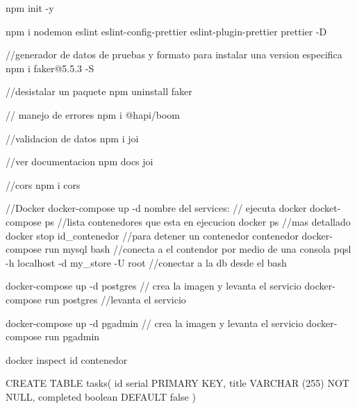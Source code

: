 npm init -y

npm i nodemon eslint eslint-config-prettier eslint-plugin-prettier prettier -D


//generador de datos de pruebas y formato para instalar una version especifica
npm i faker@5.5.3 -S

//desistalar un paquete
npm uninstall faker

// manejo de errores
npm i @hapi/boom

//validacion de datos
npm i joi

//ver documentacion
npm docs joi

//cors
npm i cors

//Docker
docker-compose up -d {nombre del services:} // ejecuta docker
docket-compose ps //lista contenedores que esta en ejecucion
docker ps //mas detallado
docker stop {id_contenedor} //para detener un contenedor contenedor
docker-compose run mysql bash //conecta a el contendor por medio de una consola
pqsl -h localhost -d my_store -U root //conectar a la db desde el bash

docker-compose up -d postgres // crea la imagen y levanta el servicio
docker-compose run postgres //levanta el servicio

docker-compose up -d pgadmin // crea la imagen y levanta el servicio
docker-compose run pgadmin

docker inspect {id contenedor}


CREATE TABLE tasks(
	id serial PRIMARY KEY,
	title VARCHAR (255) NOT NULL,
	completed boolean DEFAULT false
)

